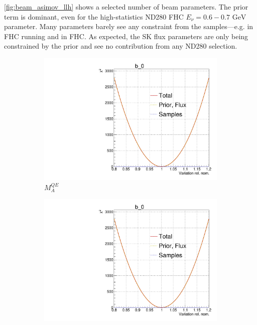 \autoref{fig:beam_asimov_llh} shows a selected number of beam parameters. The prior term is dominant, even for the high-statistics ND280 FHC \numu $E_\nu = 0.6-0.7\text{ GeV}$ parameter. Many parameters barely see any constraint from the samples---e.g. \numubar in FHC running and \nue in FHC. As expected, the SK flux parameters are only being constrained by the prior and see no contribution from any ND280 selection.
\begin{figure}[h]
	\centering
	\begin{subfigure}[t]{0.32\textwidth}
		\includegraphics[width=\textwidth, trim={0mm 0mm 0mm 11mm}, clip,page=107]{figures/mach3/Asimov/Full_LLHscan_18July_BeRPA_U_ND280logL_scan}
		\caption{$M_A^{QE}$}
	\end{subfigure}
	\begin{subfigure}[t]{0.32\textwidth}
		\includegraphics[width=\textwidth, trim={0mm 0mm 0mm 11mm}, clip,page=110]{figures/mach3/Asimov/Full_LLHscan_18July_BeRPA_U_ND280logL_scan}

\end{subfigure}
\end{figure}
